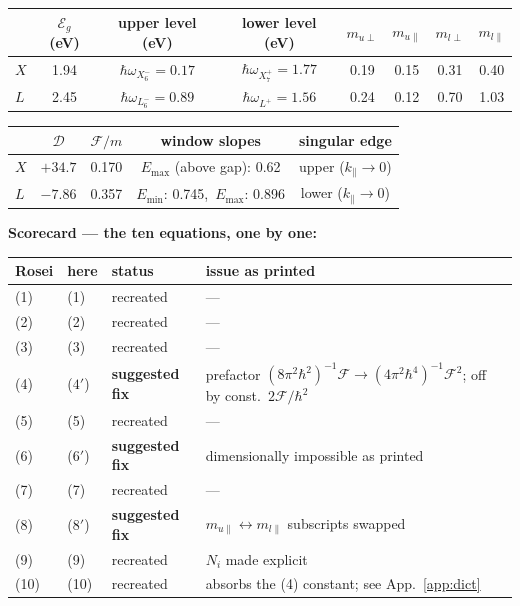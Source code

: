 \documentclass[11pt,a4paper]{article}
\numberwithin{equation}{section}
\begin{document}
\begin{center}
\small
\begin{tabular}{lccccccc}
\toprule
 & ${\mathcal{E}_g}$ (eV) & upper level (eV) & lower level (eV) & $m_{u\perp}$ & $m_{u\parallel}$ & $m_{l\perp}$ & $m_{l\parallel}$ \\
\midrule
$X$ & 1.94 & ${\hbar\omega_{X_6^-}}=0.17$ & ${\hbar\omega_{X_7^+}}=1.77$ & 0.19 & 0.15 & 0.31 & 0.40 \\
$L$ & 2.45 & ${\hbar\omega_{L_6^-}}=0.89$ & ${\hbar\omega_{L^+}}=1.56$ & 0.24 & 0.12 & 0.70 & 1.03 \\
\bottomrule
\end{tabular}
\medskip
\begin{tabular}{lcccc}
\toprule
 & ${\mathcal{D}}$ & ${\mathcal{F}}/m$ & window slopes & singular edge \\
\midrule
$X$ & $+34.7$ & 0.170 & $E_{\max}$ (above gap): 0.62 & upper (${k_{\parallel}}\to0$) \\
$L$ & $-7.86$ & 0.357 & $E_{\min}$: 0.745,\ $E_{\max}$: 0.896 & lower (${k_{\parallel}}\to0$) \\
\bottomrule
\end{tabular}\end{center}

\medskip
\noindent\textbf{Scorecard --- the ten equations, one by one:}

\begin{center}
\small
\begin{tabular}{llll}
\toprule
Rosei & here & status & issue as printed \\
\midrule
(1) & (1) & recreated & --- \\
(2) & (2) & recreated & --- \\
(3) & (3) & recreated & --- \\
(4) & ($4'$) & \textbf{suggested fix} & prefactor $(8\pi^2\hbar^2)^{-1}{\mathcal{F}}\to(4\pi^2\hbar^4)^{-1}{\mathcal{F}}^2$; off by const.\ $2{\mathcal{F}}/\hbar^2$ \\
(5) & (5) & recreated & --- \\
(6) & ($6'$) & \textbf{suggested fix} & dimensionally impossible as printed \\
(7) & (7) & recreated & --- \\
(8) & ($8'$) & \textbf{suggested fix} & $m_{u\parallel}\leftrightarrow m_{l\parallel}$ subscripts swapped \\
(9) & (9) & recreated & $N_i$ made explicit \\
(10) & (10) & recreated & absorbs the (4) constant; see App.~\ref{app:dict} \\
\bottomrule
\end{tabular}\end{center}
\end{document}
